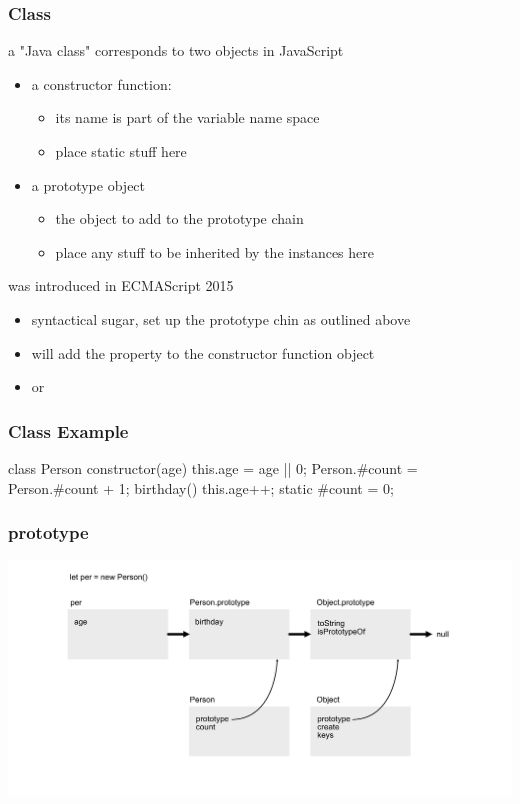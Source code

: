 \begin{frame}[fragile] \frametitle{Class}
a "Java class" corresponds to two objects in JavaScript
\begin{itemize}
  \item a constructor function:
  \begin{itemize}
    \item its name is part of the variable name space
    \item place static stuff here
  \end{itemize}
  \item a prototype object
  \begin{itemize}
    \item the object to add to the prototype chain
    \item place any stuff to be inherited by the instances here
  \end{itemize}
\end{itemize}
\vspace{5mm}

 was introduced in ECMAScript 2015
\begin{itemize}
  \item syntactical sugar, set up the prototype chin as outlined above
  \item {} will add the property to the constructor function object
  \item {} or 
\end{itemize}
\end{frame}
\begin{frame}[fragile] \frametitle{Class Example}
\begin{CodeBox}{}
class Person {
  constructor(age) {
    this.age = age || 0;
    Person.#count = Person.#count + 1;
  }
  birthday() {
    this.age++;
  }
  static #count = 0;
}
\end{CodeBox}
\end{frame}

\begin{frame}[fragile] \frametitle{prototype}
  \centering
  \includegraphics[width=14cm]{img/prototype_chain6}
\end{frame}


